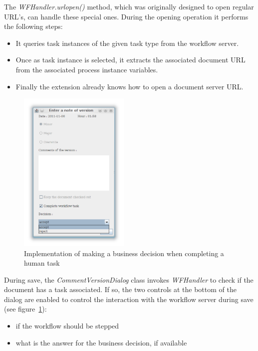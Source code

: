 The \emph{WFHandler.urlopen()} method, which was originally designed to open
regular URL's, can handle these special ones. During the opening operation it performs the following steps:

\begin{itemize}
\item It queries task instances of the given task type from the workflow server.
\item Once as task instance is selected, it extracts the associated document URL from the associated process instance variables.
\item Finally the extension already knows how to open a document server URL.
\end{itemize}

\begin{figure}[H]
\centering
\includegraphics[width=200px,keepaspectratio]{implementation-decision.png}
\caption{Implementation of making a business decision when completing a human task}
\label{fig:implementation-decision}
\end{figure}

During save, the \emph{CommentVersionDialog} class invokes \emph{WFHandler} to check if the document has a task associated. If so, the two controls at the bottom of the dialog are enabled to control the interaction with the workflow server during save (see figure~\ref{fig:implementation-decision}):

\begin{itemize}
\item if the workflow should be stepped
\item what is the answer for the business decision, if available
\end{itemize}

